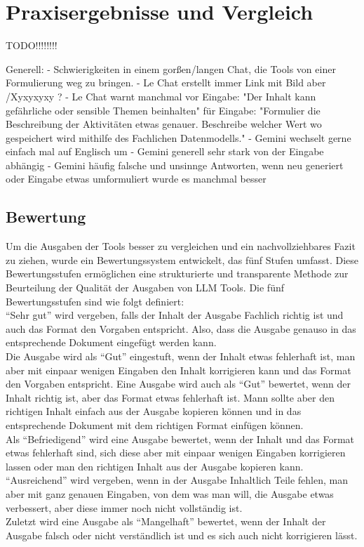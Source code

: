 
\chapter{Praxisergebnisse und Vergleich} 

TODO!!!!!!!!

Generell:
    - Schwierigkeiten in einem gorßen/langen Chat, die Tools von einer Formulierung weg zu bringen. 
    - Le Chat erstellt immer Link mit Bild aber /Xyxyxyxy ?
    - Le Chat warnt manchmal vor Eingabe: "Der Inhalt kann gefährliche oder sensible Themen beinhalten" für Eingabe:
    "Formulier die Beschreibung der Aktivitäten etwas genauer. Beschreibe welcher Wert wo gespeichert wird mithilfe des Fachlichen Datenmodells."
    - Gemini wechselt gerne einfach mal auf Englisch um
    - Gemini generell sehr stark von der Eingabe abhängig
    - Gemini häufig falsche und unsinnge Antworten, wenn neu generiert oder Eingabe etwas umformuliert wurde es manchmal besser


\section{Bewertung}  \label{BewertungLLMTools}

Um die Ausgaben der Tools besser zu vergleichen und ein nachvollziehbares Fazit zu ziehen, wurde ein Bewertungssystem 
entwickelt, das fünf Stufen umfasst. Diese Bewertungsstufen ermöglichen eine strukturierte und transparente Methode 
zur Beurteilung der Qualität der Ausgaben von LLM Tools. Die fünf Bewertungsstufen sind wie folgt definiert:\\

``Sehr gut'' wird vergeben, falls der Inhalt der Ausgabe Fachlich richtig ist und auch das Format den Vorgaben entspricht.
Also, dass die Ausgabe genauso in das entsprechende Dokument eingefügt werden kann.\\
Die Ausgabe wird als ``Gut'' eingestuft, wenn der Inhalt etwas fehlerhaft ist, man aber mit einpaar wenigen Eingaben 
den Inhalt korrigieren kann und das Format den Vorgaben entspricht. Eine Ausgabe wird auch als ``Gut'' bewertet, wenn 
der Inhalt richtig ist, aber das Format etwas fehlerhaft ist. Mann sollte aber den richtigen Inhalt einfach aus der 
Ausgabe kopieren können und in das entsprechende Dokument mit dem richtigen Format einfügen können.\\
Als ``Befriedigend'' wird eine Ausgabe bewertet, wenn der Inhalt und das Format etwas fehlerhaft sind, sich diese aber 
mit einpaar wenigen Eingaben korrigieren lassen oder man den richtigen Inhalt aus der Ausgabe kopieren kann.\\
``Ausreichend'' wird vergeben, wenn in der Ausgabe Inhaltlich Teile fehlen, man aber mit ganz genauen Eingaben, von dem 
was man will, die Ausgabe etwas verbessert, aber diese immer noch nicht vollständig ist.\\
Zuletzt wird eine Ausgabe als ``Mangelhaft'' bewertet, wenn der Inhalt der Ausgabe falsch oder nicht verständlich ist
und es sich auch nicht korrigieren lässt.\\

